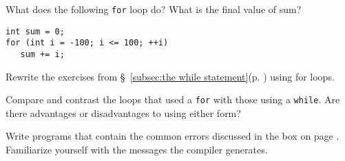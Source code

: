 %
%
\begin{question}
What does the following \verb|for| loop do? What is the final value
of sum?
\begin{lstlisting}
int sum = 0;
for (int i = -100; i <= 100; ++i)
   sum += i;
\end{lstlisting}
\end{question}

\begin{question}
Rewrite the exercises from \S~\ref{subsec:the while statement}(p. \pageref{subsec:the while statement}) using for loops.
\end{question}

\begin{question}
Compare and contrast the loops that used a \verb|for| with those
using a \verb|while|. Are there advantages or disadvantages to using either form?
\end{question}

\begin{question}
Write programs that contain the common errors discussed in
the box on page \pageref{box:compilation revisited}. Familiarize yourself with the messages the compiler
generates.
\end{question}
